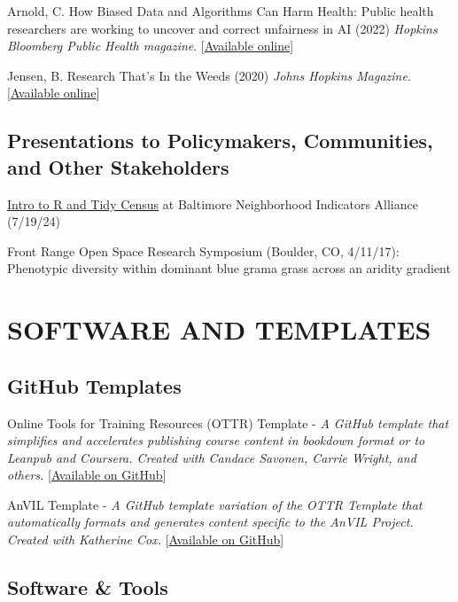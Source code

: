 \documentclass{cv}
\begin{document}
Arnold, C. How Biased Data and Algorithms Can Harm Health: Public health researchers are working to uncover and correct unfairness in AI (2022) \textit{Hopkins Bloomberg Public Health magazine}. [\href{https://magazine.publichealth.jhu.edu/2022/how-biased-data-and-algorithms-can-harm-health}{Available online}]

Jensen, B. Research That's In the Weeds (2020) \textit{Johns Hopkins Magazine}. [\href{https://hub.jhu.edu/magazine/2020/winter/ava-hoffman-urban-ecology/}{Available online}]

\subsection*{Presentations to Policymakers, Communities, and Other Stakeholders}

\href{https://www.avahoffman.com/BDD24/}{Intro to R and Tidy Census} at Baltimore Neighborhood Indicators Alliance (7/19/24)

Front Range Open Space Research Symposium (Boulder, CO, 4/11/17): Phenotypic diversity within dominant blue grama grass across an aridity gradient


\section*{SOFTWARE AND TEMPLATES}

\subsection*{GitHub Templates}

Online Tools for Training Resources (OTTR) Template - \textit{A GitHub template that simplifies and accelerates publishing course content in bookdown format or to Leanpub and Coursera. Created with Candace Savonen, Carrie Wright, and others.} [\href{https://github.com/jhudsl/OTTR_Template}{Available on GitHub}]

AnVIL Template - \textit{A GitHub template variation of the OTTR Template that automatically formats and generates content specific to the AnVIL Project. Created with Katherine Cox.} [\href{https://github.com/jhudsl/AnVIL_Template}{Available on GitHub}]

\subsection*{Software \& Tools}
\end{document}
